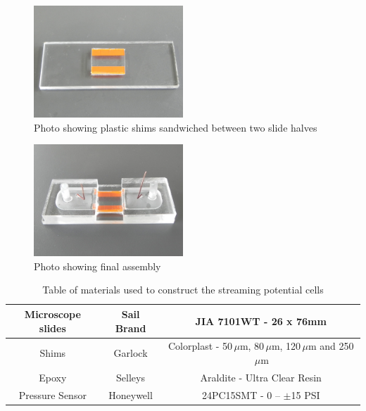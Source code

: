     \begin{figure}
      \centering
      \includegraphics[width=0.5\textwidth]{content/pt1/01-PowerHarvesting/graphics/Photo_streamingPotential_Assembly_Step2.JPG}
      \caption{\label{fig:Photo_streamingPotential_Assembly_Step2}Photo showing plastic shims sandwiched between two slide halves}
    \end{figure}

    \begin{figure}
      \centering
      \includegraphics[width=0.5\textwidth]{content/pt1/01-PowerHarvesting/graphics/Photo_streamingPotential_Assembly_Step3.JPG}
      \caption{\label{fig:Photo_streamingPotential_Assembly_Step3}Photo showing final assembly}
    \end{figure}

    \begin{table}
      \begin{tabular}{|c|c|c|} \hline Microscope slides & Sail Brand & JIA 7101WT -
          26 x 76mm\tabularnewline \hline Shims & Garlock & Colorplast - 50$\,\mu$m,
          80$\,\mu$m, 120$\,\mu$m and 250$\,\mu$m\tabularnewline \hline Epoxy &
          Selleys & Araldite - Ultra Clear Resin\tabularnewline \hline Pressure
          Sensor & Honeywell & 24PC15SMT - 0 -- $\pm$15 PSI\tabularnewline \hline
      \end{tabular}
      \caption{\label{Table_StreamingCell_MaterialsUsed}Table of materials used to construct the streaming potential cells}
    \end{table}

